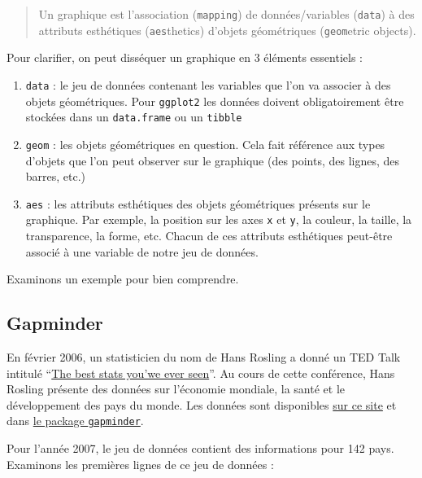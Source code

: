 \documentclass[
  a4paper,
  DIV=11,
  numbers=noendperiod,
  oneside]{scrreprt}
\providecommand{\tightlist}{%
  \setlength{\itemsep}{0pt}\setlength{\parskip}{0pt}}\usepackage{longtable,booktabs,array}
\begin{document}
\begin{quote}
Un graphique est l'association (\texttt{mapping}) de données/variables
(\texttt{data}) à des attributs esthétiques (\texttt{aes}thetics)
d'objets géométriques (\texttt{geom}etric objects).
\end{quote}

Pour clarifier, on peut disséquer un graphique en 3 éléments essentiels
:

\begin{enumerate}
\def\labelenumi{\arabic{enumi}.}
\tightlist
\item
  \texttt{data} : le jeu de données contenant les variables que l'on va
  associer à des objets géométriques. Pour \texttt{ggplot2} les données
  doivent obligatoirement être stockées dans un \texttt{data.frame} ou
  un \texttt{tibble}
\item
  \texttt{geom} : les objets géométriques en question. Cela fait
  référence aux types d'objets que l'on peut observer sur le graphique
  (des points, des lignes, des barres, etc.)
\item
  \texttt{aes} : les attributs esthétiques des objets géométriques
  présents sur le graphique. Par exemple, la position sur les axes
  \texttt{x} et \texttt{y}, la couleur, la taille, la transparence, la
  forme, etc. Chacun de ces attributs esthétiques peut-être associé à
  une variable de notre jeu de données.
\end{enumerate}

Examinons un exemple pour bien comprendre.

\subsection{Gapminder}\label{gapminder}

En février 2006, un statisticien du nom de Hans Rosling a donné un TED
Talk intitulé
``\href{https://www.ted.com/talks/hans_rosling_shows_the_best_stats_you_ve_ever_seen}{The
best stats you'we ever seen}''. Au cours de cette conférence, Hans
Rosling présente des données sur l'économie mondiale, la santé et le
développement des pays du monde. Les données sont disponibles
\href{https://www.gapminder.org/tools/\#$chart-type=bubbles}{sur ce
site} et dans
\href{https://cran.r-project.org/web/packages/gapminder/index.html}{le
package \texttt{gapminder}}.

Pour l'année 2007, le jeu de données contient des informations pour 142
pays. Examinons les premières lignes de ce jeu de données :
\end{document}
